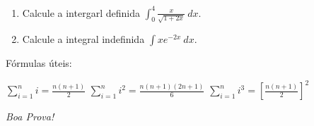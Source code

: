 \documentclass[a4paper,5pt]{amsbook}
\newcommand{\ds}{\displaystyle}
\begin{document}
\begin{enumerate}
	\vspace{0.5cm}

	\item Calcule a intergarl definida $\ds\int_0^4 \frac{x}{\sqrt{1+2x}}\ dx$.
	\vspace{0.5cm}

	\item Calcule a integral indefinida $\ds\int x e^{-2x}\ dx$.
\end{enumerate}

\vspace{0.5cm}
F\'ormulas \'uteis:

$\ds\sum_{i=1}^n i = \frac{n(n+1)}{2}$\hspace{2cm}
$\ds\sum_{i=1}^n i^2 = \frac{n(n+1)(2n+1)}{6}$\hspace{2cm}
$\ds\sum_{i=1}^n i^3 = {\left[\frac{n(n+1)}{2}\right]}^2$

\begin{flushright}
	\vspace{1cm}
	\textit{Boa Prova!}
\end{flushright}
\end{document}
